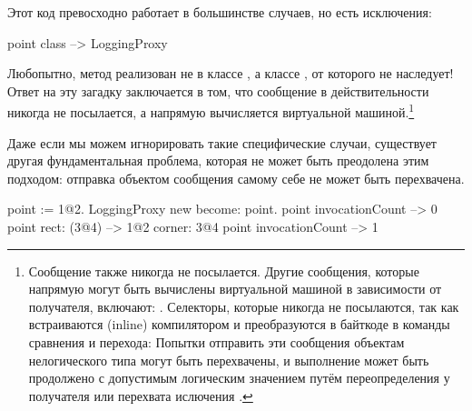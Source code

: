 \documentclass[a4paper,10pt,twoside]{book}
\begin{document}
{%
Этот код превосходно работает в большинстве случаев, но есть исключения:
\begin{code}{}
point class --> LoggingProxy
\end{code}
Любопытно, метод  реализован не в классе , а классе , от которого  не наследует!
Ответ на эту загадку заключается в том, что сообщение  в действительности никогда не посылается, а напрямую вычисляется виртуальной машиной.\footnote{Сообщение  также никогда не посылается.
Другие сообщения, которые напрямую могут быть вычислены виртуальной машиной в зависимости от получателя, включают:
\ct{+- < > <= >= = ~= * / \ ==}
.
Селекторы, которые никогда не посылаются, так как встраиваются (inline) компилятором и преобразуются в байткоде в команды сравнения и перехода:
Попытки отправить эти сообщения объектам нелогического типа могут быть перехвачены, и выполнение может быть продолжено с допустимым логическим значением путём переопределения  у получателя или перехвата ислючения .
}%

Даже если мы можем игнорировать такие специфические случаи, существует другая фундаментальная проблема, которая не может быть преодолена этим подходом: отправка объектом сообщения самому себе не может быть перехвачена.
\begin{code}{}
point := 1@2.
LoggingProxy new become: point.
point invocationCount --> 0
point rect: (3@4)        --> 1@2 corner: 3@4
point invocationCount --> 1
\end{code}

}
\end{document}
